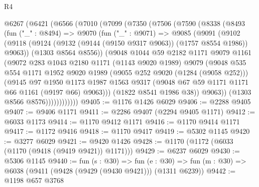 \begin{lexlean}{R4}
\begin{coremodule}
  @6267
    (@6421
      (@6566
        (@7010
          (@7099
            (@7350
              (@7506
                (@7590
                  (@8338
                    (@8493
                      (fun ("_" : @8494) =>
                      @9070
                        (fun ("_" : @9071) =>
                        @9085
                          (@9091
                            (@9102
                              (@9118
                                (@9124
                                  (@9132 (@9144 (@9150 @9317 @9063)) (@1757 @8554 @1986))
                                  @9063))
                              (@1303 @8564 @8556))
                            (@9048
                              @1044
                              @59
                              @2182
                              @1171
                              @9079
                              @1161
                              (@9072
                                @283
                                @1043
                                @2180
                                @1171
                                (@1143 @9020 @1989)
                                @9079
                                (@9048
                                  @535
                                  @554
                                  @1171
                                  @1952
                                  @9020
                                  @1989
                                  (@9055 @252 @9020 (@1284 (@9058 @252)))
                                  (@9145
                                    @97
                                    @1950
                                    @1173
                                    @1987
                                    @1563
                                    @9317
                                    (@9048 @67 @59 @1171 @1171 @66 @1161 (@9197 @66) @9063)))
                                (@1822 @8541 @1986 @38))
                              @9063))
                          (@1303 @8566 @8576))))))))))))
@9405 := @1176 @1426 @6029
@9406 := @2288 @9405
@9407 := @9406 @1171
@9411 := @2286 @9407 (@2294 @9405 @1171)
@9412 := @6033 @1173
@9414 := @1170 @9412 @1171
@9416 := @1170 @9414 @1171
@9417 := @1172 @9416
@9418 := @1170 @9417
@9419 := @5302 @1145
@9420 := @3277 @6029
@9421 := @9420 @1426
@9428 := @1170 (@1172 (@6033 (@1170 (@9418 (@9419 @9421)) @1171)))
@9429 := @6237 @6029
@9430 := @5306 @1145
@9440 := fun (s : @30) =>
  fun (e : @30) => fun (m : @30) => @6038 (@9411 (@9428 (@9429 (@9430 @9421))) (@1311 @6239))
@9442 := @1198 @657 @3768

\end{coremodule}
\end{lexlean}
